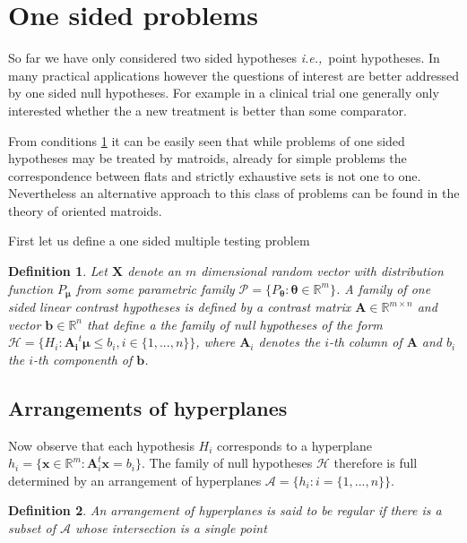 \documentclass[a4paper,12pt]{article}
\newtheorem{definition}{Definition}
\newcommand{\bs}[1]{\boldsymbol{#1}}
\newcommand{\ie}{{\em i.e.,}~}
\begin{document}
\section{One sided problems}

So far we have only considered two sided hypotheses \ie point
hypotheses. In many practical applications however the questions of
interest are better addressed by one sided null hypotheses. For
example in a clinical trial one generally only interested whether the
a new treatment is better than some comparator. 

From conditions \ref{} it can be easily seen that while problems of
one sided hypotheses may be treated by matroids, already for simple
problems the correspondence between flats and strictly exhaustive sets
is not one to one. Nevertheless an alternative approach to this class
of problems can be found in the theory of oriented matroids.

First let us define a one sided multiple testing problem

\begin{definition}
  Let $\bs{X}$ denote an $m$ dimensional random vector with
  distribution function $P_{\bs{\mu}}$ from some parametric family
  $\mathscr{P} = \{P_{\bs{\theta}}: \bs{\theta} \in \mathbb{R}^m\}$. A
  family of {\em one sided linear contrast hypotheses} is defined by a
  contrast matrix $\bs{A} \in \mathbb{R}^{m\times n}$ and vector
  $\bs{b} \in \mathbb{R}^n$ that define a the family of null
  hypotheses of the form $\mathscr{H} = \{H_i: \bs{A_i}^t\bs{\mu} \leq
  b_i,i \in \{1,...,n\}\}$, where $\bs{A}_i$ denotes the $i$-th column
  of $\bs{A}$ and $b_i$ the $i$-th componenth of $\bs{b}$.
\end{definition}

\subsection{Arrangements of hyperplanes}
\label{sec:hyperplanes}

Now observe that each hypothesis $H_i$ corresponds to a hyperplane
$h_i = \{\bs{x} \in \mathbb{R}^m: \bs{A}_i^t\bs{x} = b_i\}$. The
family of null hypotheses $\mathscr{H}$ therefore is full determined
by an arrangement of hyperplanes $\mathscr{A} = \{h_i:i=
\{1,...,n\}\}$. 

\begin{definition}
  An arrangement of hyperplanes is said to be regular if there is a
  subset of $\mathscr{A}$ whose intersection is a single point
\end{definition}
\end{document}
